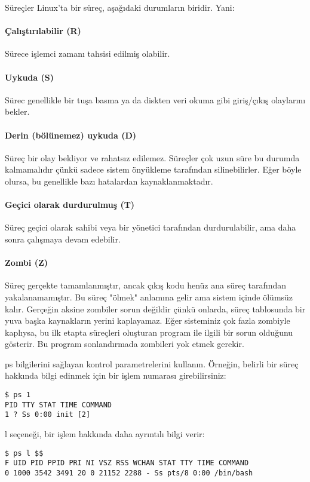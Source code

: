 \begin{section}{Süreçler}
Linux'ta bir süreç, aşağıdaki durumların biridir. Yani:
\paragraph{Çalıştırılabilir (R)}{Sürece işlemci zamanı tahsisi edilmiş olabilir.}
\paragraph{Uykuda (S)}{Sürec genellikle bir tuşa basma  ya da diskten veri okuma gibi  giriş/çıkış olaylarını bekler.}
\paragraph{Derin (bölünemez) uykuda (D)}{Süreç bir olay bekliyor ve rahatsız edilemez. Süreçler çok uzun süre bu durumda kalmamalıdır çünkü sadece sistem önyükleme tarafından silinebilirler. Eğer böyle olursa, bu genellikle bazı hatalardan kaynaklanmaktadır.}
\paragraph{Geçici olarak durdurulmuş (T)}{Süreç geçici olarak sahibi veya bir yönetici tarafından durdurulabilir, ama daha sonra çalışmaya devam edebilir.}
\paragraph{Zombi (Z)}{Süreç gerçekte tamamlanmıştır, ancak çıkış kodu henüz ana süreç tarafından yakalanamamıştır. Bu süreç "ölmek" anlamına gelir ama sistem içinde ölümsüz kalır. Gerçeğin aksine zombiler sorun değildir çünkü onlarda, süreç tablosunda bir yuva başka kaynakların yerini kaplayamaz. Eğer sisteminiz çok fazla zombiyle kaplıysa, bu ilk etapta süreçleri oluşturan program ile ilgili bir sorun olduğunu gösterir. Bu program sonlandırmada zombileri yok etmek gerekir.
}

ps bilgilerini sağlayan kontrol parametrelerini kullanın. Örneğin, belirli bir süreç hakkında bilgi edinmek için bir işlem numarası girebilirsiniz:
\begin{verbatim}
$ ps 1
PID TTY STAT TIME COMMAND
1 ? Ss 0:00 init [2]
\end{verbatim}

l seçeneği, bir işlem hakkında daha ayrıntılı bilgi verir:
\begin{verbatim}
$ ps l $$
F UID PID PPID PRI NI VSZ RSS WCHAN STAT TTY TIME COMMAND
0 1000 3542 3491 20 0 21152 2288 - Ss pts/8 0:00 /bin/bash
\end{verbatim}


\end{section}

